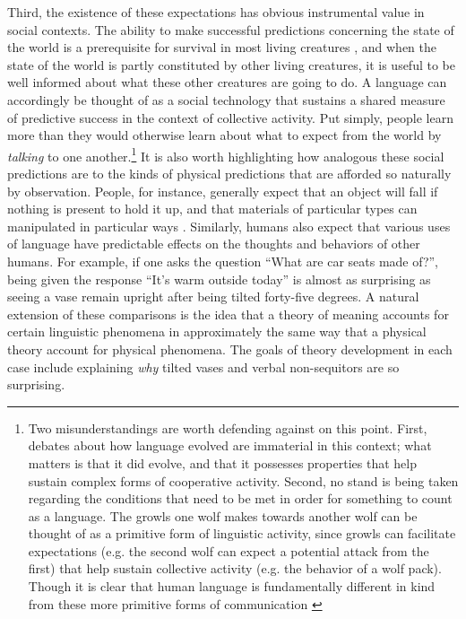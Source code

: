 Third, the existence of these expectations has obvious instrumental value in social contexts. The ability to make successful predictions concerning the state of the world is a prerequisite for survival in most living creatures \citep{clark:2013,Dennett:1987}, and when the state of the world is partly constituted by other living creatures, it is useful to be well informed about what these other creatures are going to do. A language can accordingly be thought of as a social technology that sustains a shared measure of predictive success in the context of collective activity. Put simply, people learn more than they would otherwise learn about what to expect from the world by \textit{talking} to one another.\footnote{Two misunderstandings are worth defending against on this point. First, debates about how language evolved are immaterial in this context; what matters is that it did evolve, and that it possesses properties that help sustain complex forms of cooperative activity. Second, no stand is being taken regarding the conditions that need to be met in order for something to count as a language. The growls one wolf makes towards another wolf can be thought of as a primitive form of linguistic activity, since growls can facilitate expectations (e.g. the second wolf can expect a potential attack from the first) that help sustain collective activity (e.g. the behavior of a wolf pack). Though it is clear that human language is fundamentally different in kind from these more primitive forms of communication \citep{Harley:2014}} It is also worth highlighting how analogous these social predictions are to the kinds of physical predictions that are afforded so naturally by observation. People, for instance, generally expect that an object will fall if nothing is present to hold it up, and that materials of particular types can manipulated in particular ways \citep{Dennett:1987}. Similarly, humans also expect that various uses of language have predictable effects on the thoughts and behaviors of other humans. For example, if one asks the question ``What are car seats made of?'', being given the response ``It's warm outside today'' is almost as surprising as seeing a vase remain upright after being tilted forty-five degrees. A natural extension of these comparisons is the idea that a theory of meaning accounts for certain linguistic phenomena in approximately the same way that a physical theory account for physical phenomena. The goals of theory development in each case include explaining \textit{why} tilted vases and verbal non-sequitors are so surprising. 

